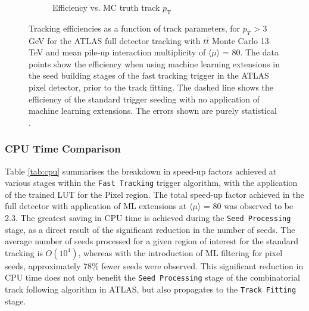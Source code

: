 \begin{figure}[!htbp]
\begin{subfigure}[b]{0.86\textwidth}
        \caption{Efficiency vs. MC truth track $p_{\mathrm{T}}$}
    \label{fig:efficiencies-ml-hit-pair-predictor-pt}
    \end{subfigure}
\caption{Tracking efficiencies as a function of track parameters, for $p_{T}$ > 3 GeV for the ATLAS full detector tracking with $t\overline{t}$ Monte Carlo 13 TeV and mean pile-up interaction multiplicity of $\langle \mu \rangle$ = 80. The data points show the efficiency when using machine learning extensions in the seed building stages of the fast tracking trigger in the ATLAS pixel detector, prior to the track fitting. The dashed line shows the efficiency of the standard trigger seeding with no application of machine learning extensions. The errors shown are purely statistical \cite{public-hlt}. }
\label{fig:efficiencies-ml-hit-pair-predictor}
\end{figure}



\subsubsection{CPU Time Comparison}


Table \ref{tab:cpu} summarises the breakdown in speed-up factors achieved at various stages within the \texttt{Fast Tracking} trigger algorithm, with the application of the trained LUT for the Pixel region. The total speed-up factor achieved in the full detector with application of ML extensions at $\langle \mu \rangle$ = 80 was observed to be 2.3. The greatest saving in CPU time is achieved during the \texttt{Seed Processing} stage, as a direct result of the significant reduction in the number of seeds. The average number of seeds processed for a given region of interest for the standard tracking is $O(10^{4})$, whereas with the introduction of ML filtering for pixel seeds, approximately 78\% fewer seeds were observed. This significant reduction in CPU time does not only benefit the \texttt{Seed Processing} stage of the combinatorial track following algorithm in ATLAS, but also propagates to the \texttt{Track Fitting} stage.

